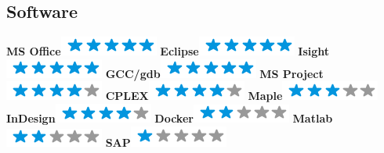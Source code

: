 \documentclass[]{friggeri-cv}
\begin{document}
\begin{aside}
  \section{Software}
    \textbf{MS Office}\includegraphics[scale=0.40]{img/5stars.png}
    \textbf{Eclipse}\includegraphics[scale=0.40]{img/5stars.png}
    \textbf{Isight}\includegraphics[scale=0.40]{img/5stars.png}
    \textbf{GCC/gdb}\includegraphics[scale=0.40]{img/5stars.png}
     \textbf{MS Project}\includegraphics[scale=0.40]{img/4stars.png}  
	\textbf{CPLEX}\includegraphics[scale=0.4]{img/4stars.png}
	\textbf{Maple}\includegraphics[scale=0.4]{img/3stars.png}
    \textbf{InDesign}\includegraphics[scale=0.4]{img/4stars.png}
    \textbf{Docker}\includegraphics[scale=0.4]{img/2stars.png} 
    \textbf{Matlab}\includegraphics[scale=0.4]{img/2stars.png}
    \textbf{SAP}\includegraphics[scale=0.40]{img/1stars.png} 
    ~

\end{aside}
\end{document}
